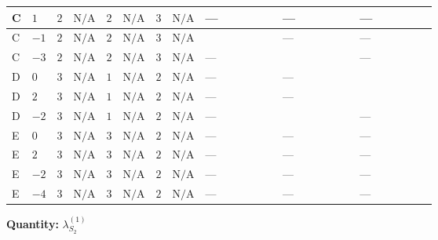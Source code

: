 \documentclass[8pt]{article}
\begin{document}
\begin{landscape}
\begin{longtable}{@{}llcccccc >{\raggedright\arraybackslash}p{0.21\linewidth} >{\raggedright\arraybackslash}p{0.21\linewidth} >{\raggedright\arraybackslash}p{0.21\linewidth}@{}}
\midrule
C & $1$ & $2$ & $\text{N/A}$ & $2$ & $\text{N/A}$ & $3$ & $\text{N/A}$ & --- & --- & --- \\
\midrule
C & $-1$ & $2$ & $\text{N/A}$ & $2$ & $\text{N/A}$ & $3$ & $\text{N/A}$ & \scriptsize\adjustbox{max width=\linewidth}{$\begin{gathered} +24 {\lambda_{10}} \left({\lambda_{10}}\right)^{*}\end{gathered}$} & --- & --- \\
\midrule
C & $-3$ & $2$ & $\text{N/A}$ & $2$ & $\text{N/A}$ & $3$ & $\text{N/A}$ & --- & \scriptsize\adjustbox{max width=\linewidth}{$\begin{gathered} 8 {\lambda_{X_{10}}} \left({\lambda_{X_{10}}}\right)^{*}\end{gathered}$} & --- \\
\midrule
D & $0$ & $3$ & $\text{N/A}$ & $1$ & $\text{N/A}$ & $2$ & $\text{N/A}$ & --- & --- & \scriptsize\adjustbox{max width=\linewidth}{$\begin{gathered} -12 {g_1}^2 {\lambda_{S_2}^{(1)}}\end{gathered}$} \\
\midrule
D & $2$ & $3$ & $\text{N/A}$ & $1$ & $\text{N/A}$ & $2$ & $\text{N/A}$ & --- & --- & \scriptsize\adjustbox{max width=\linewidth}{$\begin{gathered} -48 {g_1}^2 {\lambda_{S_2}^{(1)}}\end{gathered}$} \\
\midrule
D & $-2$ & $3$ & $\text{N/A}$ & $1$ & $\text{N/A}$ & $2$ & $\text{N/A}$ & --- & \scriptsize\adjustbox{max width=\linewidth}{$\begin{gathered} +8 {\lambda_{X_{16}}} \left({\lambda_{X_{16}}}\right)^{*}\end{gathered}$} & --- \\
\midrule
E & $0$ & $3$ & $\text{N/A}$ & $3$ & $\text{N/A}$ & $2$ & $\text{N/A}$ & --- & --- & --- \\
\midrule
E & $2$ & $3$ & $\text{N/A}$ & $3$ & $\text{N/A}$ & $2$ & $\text{N/A}$ & --- & --- & --- \\
\midrule
E & $-2$ & $3$ & $\text{N/A}$ & $3$ & $\text{N/A}$ & $2$ & $\text{N/A}$ & --- & --- & --- \\
\midrule
E & $-4$ & $3$ & $\text{N/A}$ & $3$ & $\text{N/A}$ & $2$ & $\text{N/A}$ & --- & --- & --- \\
\midrule
\bottomrule
\end{longtable}
\clearpage
\noindent\textbf{Quantity: }$\lambda_{S_2}^{(1)}$\par\smallskip

\end{landscape}
\end{document}
